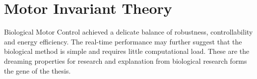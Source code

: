 %

\section{Motor Invariant Theory}
Biological Motor Control achieved a delicate balance of robustness, controllability and energy efficiency.
The real-time performance may further suggest that the biological method  is simple and requires little computational load.
These are the dreaming properties for \cms research and  explanation from biological research forms the gene of the thesis.


